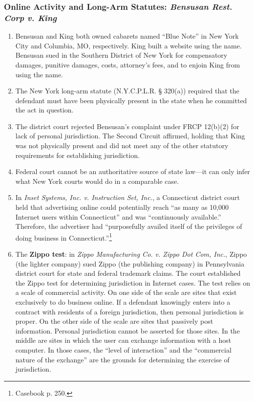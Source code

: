 \subsubsection{Online Activity and Long-Arm Statutes: \emph{Bensusan Rest. Corp 
v. King}}

\begin{enumerate}
    \item Bensusan and King both owned cabarets named ``Blue Note'' in New 
    York City and Columbia, MO, respectively. King built a website using the 
    name. Bensusan sued in the Southern District of New York for compensatory 
    damages, punitive damages, costs, attorney's fees, and to enjoin King from 
    using the name.
    \item The New York long-arm statute (N.Y.C.P.L.R. § 320(a)) required that 
    the defendant must have been physically present in the state when he 
    committed the act in question.
    \item The district court rejected Bensusan's complaint under FRCP 12(b)(2) 
    for lack of personal jurisdiction. The Second Circuit affirmed, holding
    that King was not physically present and did not meet any of the other 
    statutory requirements for establishing jurisdiction.
    \item Federal court cannot be an authoritative source of state law---it 
    can only infer what New York courts would do in a comparable case.
    \item In \emph{Inset Systems, Inc. v. Instruction Set, Inc.}, a 
    Connecticut district court held that advertising online could potentially 
    reach ``as many as 10,000 Internet users within Connecticut'' and was 
    ``continuously available.'' Therefore, the advertiser had ``purposefully 
    availed itself of the privileges of doing business in 
    Connecticut.''\footnote{Casebook p. 250.}
    \item The \textbf{Zippo test}: in \emph{Zippo Manufacturing Co. v. Zippo 
    Dot Com, Inc.}, Zippo (the lighter company) sued Zippo (the publishing 
    company) in Pennsylvania district court for state and federal trademark 
    claims. The court established the Zippo test for determining jurisdiction 
    in Internet cases. The test relies on a scale of commercial activity. On 
    one side of the scale are sites that exist exclusively to do business 
    online.  If a defendant knowingly enters into a contract with residents of 
    a foreign jurisdiction, then personal jurisdiction is proper. On the other 
    side of the scale are sites that passively post information. Personal 
    jurisdiction cannot be asserted for those sites. In the middle are sites 
    in which the user can exchange information with a host computer. In those 
    cases, the ``level of interaction'' and the ``commercial nature of the 
    exchange'' are the grounds for determining the exercise of jurisdiction.  
    \end{enumerate}

